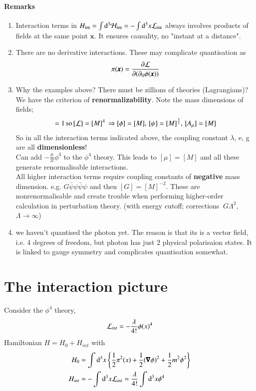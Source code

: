 \paragraph{Remarks}
\begin{enumerate}
	\item Interaction terms in $H_\text{int} = \int \dd^3 \mathcal{H}_\text{int} = - \int\dd^3x\mathcal{L}_\text{int}$ always involves products of fields at the same point $\pmb{x}$. It ensures causality, no "instant at a distance".
	\item There are no derivative interactions. These may complicate quantisation as $$\pi(\pmb{x}) = \frac{\partial\mathcal{L}}{\partial(\partial_0 \phi(\pmb{x}))}$$
	\item Why the examples above? There must be zillions of theories (Lagrangians)? \\
			We have the criterion of \textbf{renormalizability}. Note the mass dimensions of fields;
			\begin{align*}
				[S] = 1 \, \text{so} \, [\lag] = [M]^4 \, \Rightarrow [\phi] = [M] ,\, [\psi] = [M]^{\frac{3}{2}} ,\, [A_\mu] = [M]
			\end{align*}
			So in all the interaction terms indicated above, the coupling constant $\lambda$, e, g are all \textbf{dimensionless}!\\
			Can add $-\frac{\mu}{3!}\phi^3$ to the $\phi^4$ theory. This leads to $[\mu] = [M]$ and all these generate renormalisable interactions. \\
			All higher interaction terms require coupling constants of \textbf{negative} mass dimension. e.g. $G\bar{\psi}\psi\bar{\psi}\psi$ and then $[G] = [M]^{-2}$. These are nonrenormalisable and create trouble when performing higher-order calculation in perturbation theory.
			(with energy cutoff; corrections $~G\Lambda^2$, $\Lambda \rightarrow \infty$)
		\item we haven't quantised the photon yet. The reason is that its is a vector field, i.e. 4 degrees of freedom, but photon has just $2$ physical polarisaion states. It is linked to gauge symmetry and complicates quantisation somewhat.
\end{enumerate}
\section{The interaction picture}
Consider the $\phi^4$ theory, 
\begin{align}
\mathcal{L}_{int} = -\frac{\lambda}{4!} \phi(x)^4
\end{align}
Hamiltonian $H = H_0 + H_{int}$ with 
\begin{align}
	H_0 &= \int\dd^3 x \left\{ \frac{1}{2}\pi^2(x) + \frac{1}{2}(\pmb{\nabla}\phi)^2 + \frac{1}{2}m^2\phi^2 \right\}\\
	H_{int} &= -\int\dd^3x \mathcal{L}_{int} = \frac{\lambda}{4!}\int\dd^3x \phi^4 
\end{align}

